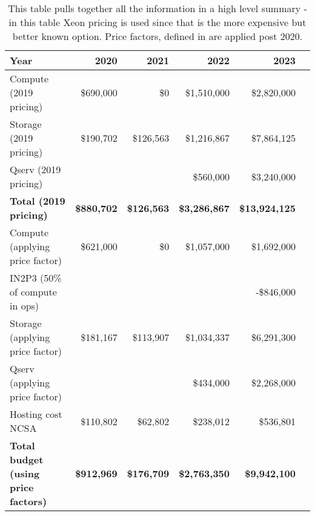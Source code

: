 \tiny \begin{longtable} { |p{}  |r  |r  |r  |r  |r |} 
\caption{This table pulls together all the information in a high level summary - in this table Xeon pricing is used since that is the more expensive but better known option. Price factors, defined in  are applied post 2020.
 \label{tab:Summary}}\\ 
\hline 
\textbf{Year}&\textbf{2020}&\textbf{2021}&\textbf{2022}&\textbf{2023} \\ \hline
{Compute (2019 pricing)}&{\$690,000}&{\$0}&{\$1,510,000}&{\$2,820,000} \\ \hline
{Storage (2019 pricing)}&{\$190,702}&{\$126,563}&{\$1,216,867}&{\$7,864,125} \\ \hline
{Qserv (2019 pricing)}&{}&{}&{\$560,000}&{\$3,240,000} \\ \hline
\textbf{Total (2019 pricing)}&\textbf{\$880,702}&\textbf{\$126,563}&\textbf{\$3,286,867}&\textbf{\$13,924,125} \\ \hline
{Compute (applying price factor)}&{\$621,000}&{\$0}&{\$1,057,000}&{\$1,692,000} \\ \hline
{IN2P3 (50\% of compute in ops)}&{}&{}&{}&{-\$846,000} \\ \hline
{Storage (applying price factor)}&{\$181,167}&{\$113,907}&{\$1,034,337}&{\$6,291,300} \\ \hline
{Qserv (applying price factor)}&{}&{}&{\$434,000}&{\$2,268,000} \\ \hline
{Hosting cost NCSA
}&{\$110,802}&{\$62,802}&{\$238,012}&{\$536,801} \\ \hline
\textbf{Total budget (using price factors)}&\textbf{\$912,969}&\textbf{\$176,709}&\textbf{\$2,763,350}&\textbf{\$9,942,100} \\ \hline
\end{longtable} \normalsize
